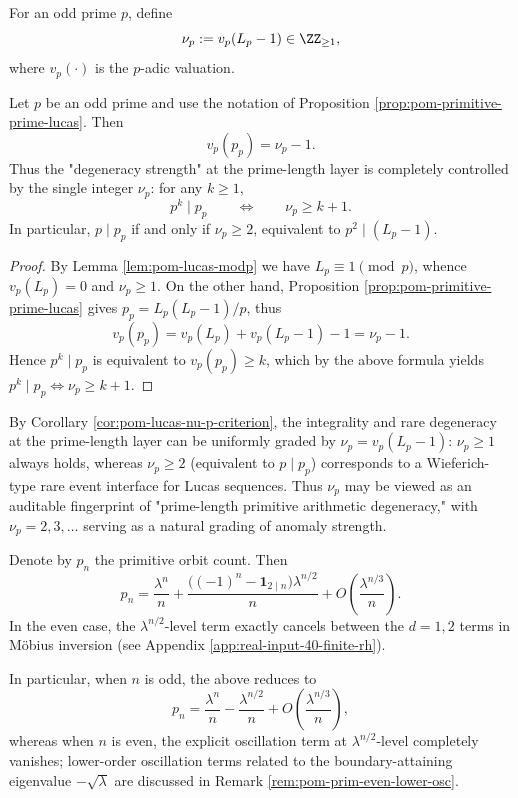 \begin{definition}\label{def:pom-lucas-nu-p}
For an odd prime \(p\), define
\[
\nu_p:=v_p(L_p-1)\in\ZZ_{\ge 1},
\]
where \(v_p(\cdot)\) is the \(p\)-adic valuation.
\end{definition}

\begin{corollary}\label{cor:pom-lucas-nu-p-criterion}
Let \(p\) be an odd prime and use the notation of Proposition \ref{prop:pom-primitive-prime-lucas}.
Then
\[
v_p(p_p)=\nu_p-1.
\]
Thus the "degeneracy strength" at the prime-length layer is completely controlled by the single integer \(\nu_p\): for any \(k\ge 1\),
\[
p^{k}\mid p_p
\qquad\Longleftrightarrow\qquad
\nu_p\ge k+1.
\]
In particular, \(p\mid p_p\) if and only if \(\nu_p\ge 2\), equivalent to \(p^2\mid(L_p-1)\).
\end{corollary}
\begin{proof}
By Lemma \ref{lem:pom-lucas-modp} we have \(L_p\equiv 1\pmod p\), whence \(v_p(L_p)=0\) and \(\nu_p\ge 1\).
On the other hand, Proposition \ref{prop:pom-primitive-prime-lucas} gives
\(
p_p=L_p(L_p-1)/p
\), thus
\[
v_p(p_p)=v_p(L_p)+v_p(L_p-1)-1=\nu_p-1.
\]
Hence \(p^k\mid p_p\) is equivalent to \(v_p(p_p)\ge k\), which by the above formula yields \(p^k\mid p_p\Longleftrightarrow \nu_p\ge k+1\).
\end{proof}

\begin{remark}\label{rem:pom-lucas-wieferich}
By Corollary \ref{cor:pom-lucas-nu-p-criterion}, the integrality and rare degeneracy at the prime-length layer can be uniformly graded by
\(
\nu_p=v_p(L_p-1)
\):
\(\nu_p\ge 1\) always holds, whereas \(\nu_p\ge 2\) (equivalent to \(p\mid p_p\)) corresponds to a Wieferich-type rare event interface for Lucas sequences.
Thus \(\nu_p\) may be viewed as an auditable fingerprint of "prime-length primitive arithmetic degeneracy," with \(\nu_p=2,3,\dots\) serving as a natural grading of anomaly strength.
\end{remark}

\begin{corollary}\label{cor:pom-prim-odd-even}
Denote by $p_n$ the primitive orbit count. Then
\[
p_n=\frac{\lambda^n}{n}+\frac{\bigl((-1)^n-\mathbf{1}_{2\mid n}\bigr)\lambda^{n/2}}{n}
+O\!\left(\frac{\lambda^{n/3}}{n}\right).
\]
In the even case, the $\lambda^{n/2}$-level term exactly cancels between the $d=1,2$ terms in Möbius inversion (see Appendix \ref{app:real-input-40-finite-rh}).
\par
In particular, when \(n\) is odd, the above reduces to
\[
p_n=\frac{\lambda^n}{n}-\frac{\lambda^{n/2}}{n}+O\!\left(\frac{\lambda^{n/3}}{n}\right),
\]
whereas when \(n\) is even, the explicit oscillation term at \(\lambda^{n/2}\)-level completely vanishes; lower-order oscillation terms related to the boundary-attaining eigenvalue \(-\sqrt{\lambda}\) are discussed in Remark \ref{rem:pom-prim-even-lower-osc}.
\end{corollary}

